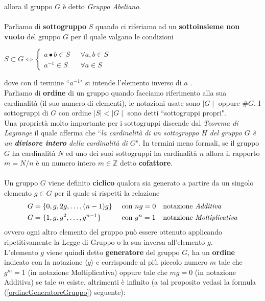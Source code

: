 \documentclass[a4paper,12pt]{tesiinfo}
\begin{document}
allora il gruppo $G$ \`e detto \textit{Gruppo Abeliano}.
\\
\\
Parliamo di \textbf{sottogruppo} $S$ quando ci riferiamo ad un \textbf{sottoinsieme non vuoto} del gruppo $G$ per il quale valgano le condizioni
\begin{center}
$S \subset G \iff
    \begin{cases}
        a \bullet b \in S \text{ } &\forall a, b \in S\\
        a^{-1} \in S \text{ } &\forall a \in S
    \end{cases}$
\end{center}
dove con il termine ``$a^{-1}$" si intende l'elemento inverso di $a$ \cite{baseTheory_GT}.
\\
Parliamo di \textbf{ordine} di un gruppo quando facciamo riferimento alla sua cardinalit\`a (il suo numero di elementi), le notazioni usate sono $\mid G \mid$ oppure $\#G$. I sottogruppi di $G$ con ordine $\mid S \mid < \mid G \mid$ sono detti ``sottogruppi propri".
\\
Una propriet\`a molto importante per i sottogruppi discende dal \textit{Teorema di Lagrange} il quale afferma che ``\emph{la cardinalit\`a di un sottogruppo $H$ del gruppo $G$ \`e un \textbf{divisore intero} della cardinalit\`a di $G$}". In termini meno formali, se il gruppo $G$ ha cardinalit\`a $N$ ed uno dei suoi sottogruppi ha cardinalit\`a $n$ allora il rapporto $m = N \big / n$ \`e un numero intero $m \in \mathbb{Z}$ detto \textbf{cofattore}.
%
%
%
%
%
%
\\
\\
Un gruppo $G$ viene definito \textbf{ciclico} qualora sia generato a partire da un singolo elemento $g \in G$ per il quale si rispetti la relazione 
\begin{align*}
 &G= \{0, g, 2g, \ldots, (n-1)g\}& \text{ con }&ng=0& &\text{notazione \textit{Additiva}}\\
 &G= \{1, g, g^2, \ldots, g^{n-1}\}& \text{ con }&g^n=1& &\text{notazione \textit{Moltiplicativa}}
\end{align*}
ovvero ogni altro elemento del gruppo pu\`o essere ottenuto applicando ripetitivamente la Legge di Gruppo o la sua inversa all'elemento $g$.\\
L'elemento $g$ viene quindi detto \textbf{generatore} del gruppo $G$, ha un \textbf{ordine} indicato con la notazione $\langle g \rangle$ e corrisponde al pi\`u piccolo numero $m$ tale che $g^m = 1$ (in notazione Moltiplicativa) oppure tale che $mg = 0$ (in notazione Additiva) se tale $m$ esiste, altrimenti \`e infinito (a tal proposito vedasi la formula (\ref{ordineGeneratoreGruppo}) seguente):
\end{document}
